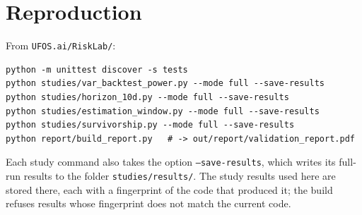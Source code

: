 \documentclass[11pt,a4paper]{article}
\begin{document}
\section{Reproduction}
From \texttt{UFOS.ai/RiskLab/}:
\begin{verbatim}
python -m unittest discover -s tests
python studies/var_backtest_power.py --mode full --save-results
python studies/horizon_10d.py --mode full --save-results
python studies/estimation_window.py --mode full --save-results
python studies/survivorship.py --mode full --save-results
python report/build_report.py   # -> out/report/validation_report.pdf
\end{verbatim}
{\sloppy Each study command also takes the option \texttt{--save-results}, which writes its full-run
results to the folder \texttt{studies/results/}. The study results used here are stored there, each with a
fingerprint of the code that produced it; the build refuses results whose fingerprint does not match the
current code.\par}
\end{document}
